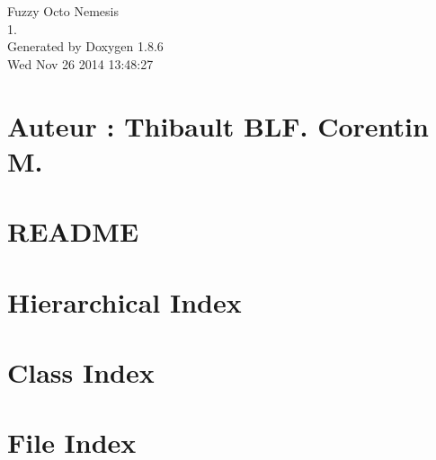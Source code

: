 \documentclass[twoside]{book}
\newcommand{\clearemptydoublepage}{%
  \newpage{\pagestyle{empty}\cleardoublepage}%
}
\begin{document}
\hypersetup{pageanchor=false}
\begin{titlepage}
\vspace*{7cm}
\begin{center}%
{\Large Fuzzy Octo Nemesis \\[1ex]\large 1. }\\
\vspace*{1cm}
{\large Generated by Doxygen 1.8.6}\\
\vspace*{0.5cm}
{\small Wed Nov 26 2014 13:48:27}\\
\end{center}
\end{titlepage}
\clearemptydoublepage
\tableofcontents
\clearemptydoublepage
{}
\hypersetup{pageanchor=true}

\chapter{Auteur \-: Thibault B\-L\-F. Corentin M.}
\label{index}\hypertarget{index}{}
\chapter{R\-E\-A\-D\-M\-E}
\label{md__r_e_a_d_m_e}
\hypertarget{md__r_e_a_d_m_e}{}

\chapter{Hierarchical Index}

\chapter{Class Index}

\chapter{File Index}

\end{document}
